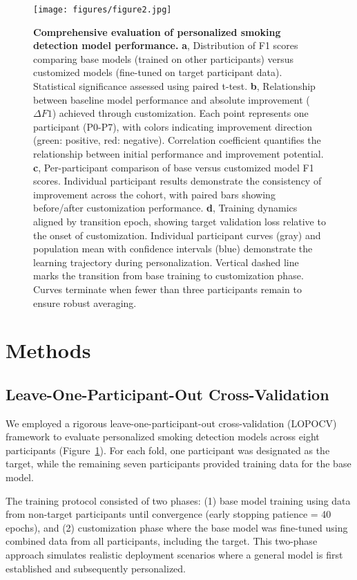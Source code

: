 \documentclass[11pt]{article}
\begin{document}
\begin{figure}[htbp]
    \centering
    \texttt{[image: figures/figure2.jpg]}
    \caption{\textbf{Comprehensive evaluation of personalized smoking detection model performance.}
    \textbf{a}, Distribution of F1 scores comparing base models (trained on other participants) versus customized models (fine-tuned on target participant data). Statistical significance assessed using paired t-test.
    \textbf{b}, Relationship between baseline model performance and absolute improvement ($\Delta F1$) achieved through customization. Each point represents one participant (P0-P7), with colors indicating improvement direction (green: positive, red: negative). Correlation coefficient quantifies the relationship between initial performance and improvement potential.
    \textbf{c}, Per-participant comparison of base versus customized model F1 scores. Individual participant results demonstrate the consistency of improvement across the cohort, with paired bars showing before/after customization performance.
    \textbf{d}, Training dynamics aligned by transition epoch, showing target validation loss relative to the onset of customization. Individual participant curves (gray) and population mean with confidence intervals (blue) demonstrate the learning trajectory during personalization. Vertical dashed line marks the transition from base training to customization phase. Curves terminate when fewer than three participants remain to ensure robust averaging.}
    \label{fig:comprehensive_results}
\end{figure}

\section{Methods}

\subsection{Leave-One-Participant-Out Cross-Validation}

We employed a rigorous leave-one-participant-out cross-validation (LOPOCV) framework to evaluate personalized smoking detection models across eight participants (Figure~\ref{fig:comprehensive_results}). For each fold, one participant was designated as the target, while the remaining seven participants provided training data for the base model.

The training protocol consisted of two phases: (1) base model training using data from non-target participants until convergence (early stopping patience = 40 epochs), and (2) customization phase where the base model was fine-tuned using combined data from all participants, including the target. This two-phase approach simulates realistic deployment scenarios where a general model is first established and subsequently personalized.
\end{document}

